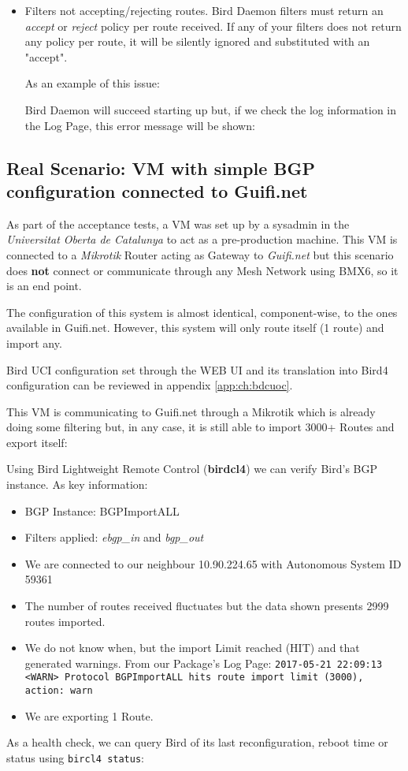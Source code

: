 \begin{itemize}
\item Filters not accepting/rejecting routes.
Bird Daemon filters must return an \textit{accept} or \textit{reject} policy per route received. If any of your filters does not return any policy per route, it will be silently ignored and substituted with an "accept".

As an example of this issue:


Bird Daemon will succeed starting up but, if we check the log information in the Log Page, this error message will be shown:


\end{itemize}

\subsection{Real Scenario: VM with simple BGP configuration connected to Guifi.net}
As part of the acceptance tests, a VM was set up by a sysadmin in the \textit{Universitat Oberta de Catalunya} to act as a pre-production machine. This VM is connected to a \textit{Mikrotik} Router acting as Gateway to \textit{Guifi.net} but this scenario does \textbf{not} connect or communicate through any Mesh Network using BMX6, so it is an end point.

The configuration of this system is almost identical, component-wise, to the ones available in Guifi.net. However, this system will only route itself (1 route) and import any.

Bird UCI configuration set through the WEB UI and its translation into Bird4 configuration can be reviewed in appendix \ref{app:ch:bdcuoc}.

This VM is communicating to Guifi.net through a Mikrotik which is already doing some filtering but, in any case, it is still able to import 3000+ Routes and export itself:



Using Bird Lightweight Remote Control (\textbf{birdcl4}) we can verify Bird's BGP instance. As key information:

\begin{itemize}
    \item BGP Instance: BGPImportALL
    \item Filters applied: \textit{ebgp\_in} and \textit{bgp\_out}
    \item We are connected to our neighbour 10.90.224.65 with Autonomous System ID 59361
    \item  The number of routes received fluctuates but the data shown presents 2999 routes imported.
    \item We do not know when, but the import Limit reached (HIT) and that generated warnings.
    From our Package's Log Page:
    \texttt{2017-05-21 22:09:13 <WARN> Protocol BGPImportALL hits route import limit (3000), action: warn}
    \item We are exporting 1 Route.
\end{itemize}

As a health check, we can query Bird of its last reconfiguration, reboot time or status using \texttt{bircl4 status}:


